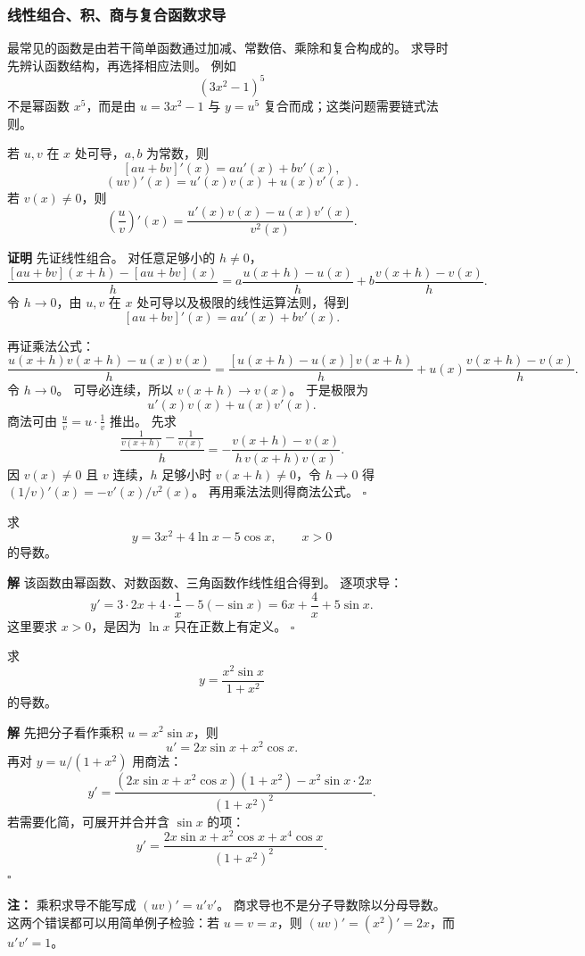 \documentclass[fontset=fandol]{ctexart}
\newenvironment{proofdetail}{\par\noindent\textbf{证明}\quad}{\hfill$\square$\par\vspace{0.8em}}
\newenvironment{solution}{\par\noindent\textbf{解}\quad}{\hfill$\square$\par\vspace{0.8em}}
\newenvironment{warning}{\par\noindent\textbf{注：}\quad}{\par\vspace{0.8em}}
\begin{document}
\subsubsection*{线性组合、积、商与复合函数求导}

最常见的函数是由若干简单函数通过加减、常数倍、乘除和复合构成的。 求导时先辨认函数结构，再选择相应法则。 例如
\[
(3x^2-1)^5
\]
不是幂函数 $x^5$，而是由 $u=3x^2-1$ 与 $y=u^5$ 复合而成；这类问题需要链式法则。

\begin{theorem}
若 $u,v$ 在 $x$ 处可导，$a,b$ 为常数，则
\[
[au+bv]'(x)=au'(x)+bv'(x),
\]
\[
(uv)'(x)=u'(x)v(x)+u(x)v'(x).
\]
若 $v(x)\neq0$，则
\[
\left(\frac{u}{v}\right)'(x)=\frac{u'(x)v(x)-u(x)v'(x)}{v^2(x)}.
\]
\end{theorem}
\begin{proofdetail}
先证线性组合。 对任意足够小的 $h\neq0$，
\[
\frac{[au+bv](x+h)-[au+bv](x)}{h}
=a\frac{u(x+h)-u(x)}{h}
+b\frac{v(x+h)-v(x)}{h}.
\]
令 $h\to0$，由 $u,v$ 在 $x$ 处可导以及极限的线性运算法则，得到
\[
[au+bv]'(x)=au'(x)+bv'(x).
\]

再证乘法公式：
\[
\frac{u(x+h)v(x+h)-u(x)v(x)}{h}
=\frac{[u(x+h)-u(x)]v(x+h)}{h}+u(x)\frac{v(x+h)-v(x)}{h}.
\]
令 $h\to0$。 可导必连续，所以 $v(x+h)\to v(x)$。 于是极限为
\[
u'(x)v(x)+u(x)v'(x).
\]
商法可由 $\frac{u}{v}=u\cdot\frac1v$ 推出。 先求
\[
\frac{\frac1{v(x+h)}-\frac1{v(x)}}{h}
=-\frac{v(x+h)-v(x)}{h\,v(x+h)v(x)}.
\]
因 $v(x)\neq0$ 且 $v$ 连续，$h$ 足够小时 $v(x+h)\neq0$，令 $h\to0$ 得 $(1/v)'(x)=-v'(x)/v^2(x)$。 再用乘法法则得商法公式。
\end{proofdetail}

\begin{example}[线性组合求导]
求
\[
y=3x^2+4\ln x-5\cos x,\qquad x>0
\]
的导数。
\end{example}
\begin{solution}
该函数由幂函数、对数函数、三角函数作线性组合得到。 逐项求导：
\[
y'=3\cdot 2x+4\cdot\frac1x-5(-\sin x)
=6x+\frac4x+5\sin x.
\]
这里要求 $x>0$，是因为 $\ln x$ 只在正数上有定义。
\end{solution}

\begin{example}[乘积与商的求导]
求
\[
y=\frac{x^2\sin x}{1+x^2}
\]
的导数。
\end{example}
\begin{solution}
先把分子看作乘积 $u=x^2\sin x$，则
\[
u'=2x\sin x+x^2\cos x.
\]
再对 $y=u/(1+x^2)$ 用商法：
\[
y'=\frac{(2x\sin x+x^2\cos x)(1+x^2)-x^2\sin x\cdot2x}{(1+x^2)^2}.
\]
若需要化简，可展开并合并含 $\sin x$ 的项：
\[
y'=\frac{2x\sin x+x^2\cos x+x^4\cos x}{(1+x^2)^2}.
\]
\end{solution}
\begin{warning}
乘积求导不能写成 $(uv)'=u'v'$。 商求导也不是分子导数除以分母导数。 这两个错误都可以用简单例子检验：若 $u=v=x$，则 $(uv)'=(x^2)'=2x$，而 $u'v'=1$。
\end{warning}
\end{document}
